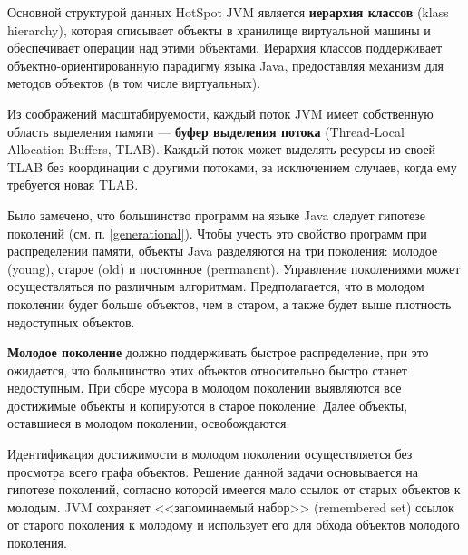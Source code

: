 Основной структурой данных HotSpot JVM является \textbf{иерархия классов} (klass hierarchy), которая описывает объекты в хранилище виртуальной машины и обеспечивает операции над этими объектами. Иерархия классов поддерживает объектно-ориентированную парадигму языка Java, предоставляя механизм для методов объектов (в том числе виртуальных). \cite{java_storage_management}

Из соображений масштабируемости, каждый поток JVM имеет собственную область выделения памяти --- \textbf{буфер выделения потока} (Thread-Local Allocation Buffers, TLAB). Каждый поток может выделять ресурсы из своей TLAB без координации с другими потоками, за исключением случаев, когда ему требуется новая TLAB. \cite{java_storage_management}

Было замечено, что большинство программ на языке Java следует гипотезе поколений (см. п. \ref{generational}). Чтобы учесть это свойство программ при распределении памяти, объекты Java разделяются на три поколения: молодое (young), старое (old) и постоянное (permanent). Управление поколениями может осуществляться по различным алгоритмам. Предполагается, что в молодом поколении будет больше объектов, чем в старом, а также будет выше плотность недоступных объектов. \cite{java_storage_management}

\textbf{Молодое поколение} должно поддерживать быстрое распределение, при это ожидается, что большинство этих объектов относительно быстро станет недоступным. При сборе мусора в молодом поколении выявляются все достижимые объекты и копируются в старое поколение. Далее объекты, оставшиеся в молодом поколении, освобождаются. \cite{java_storage_management}

Идентификация достижимости в молодом поколении осуществляется без просмотра всего графа объектов. Решение данной задачи основывается на гипотезе поколений, согласно которой имеется мало ссылок от старых объектов к молодым. JVM сохраняет <<запоминаемый набор>> (remembered set) ссылок от старого поколения к молодому и использует его для обхода объектов молодого поколения. \cite{java_storage_management}

